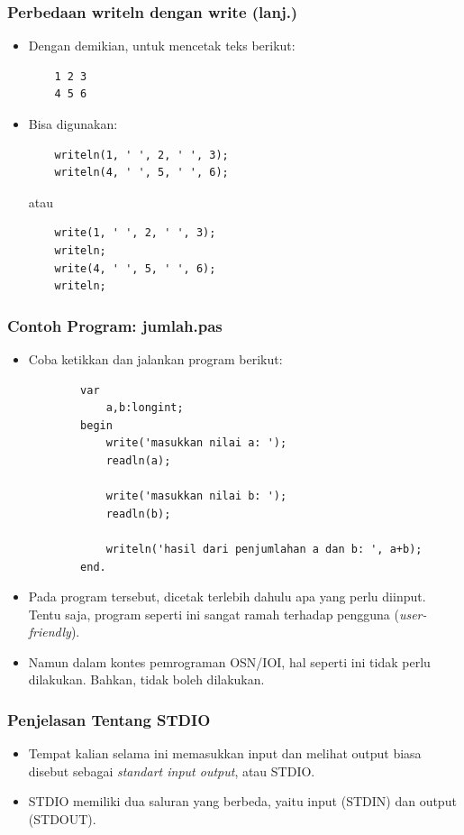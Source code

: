 \documentclass{beamer}
\begin{document}
\begin{frame}[fragile]
\frametitle{Perbedaan writeln dengan write (lanj.)}
\begin{itemize}
	\item Dengan demikian, untuk mencetak teks berikut:
	\begin{lstlisting}
	1 2 3
	4 5 6
	\end{lstlisting}
	\item Bisa digunakan:
	\begin{lstlisting}
	writeln(1, ' ', 2, ' ', 3);
	writeln(4, ' ', 5, ' ', 6);
	\end{lstlisting}
	atau
	\begin{lstlisting}
	write(1, ' ', 2, ' ', 3);
	writeln;
	write(4, ' ', 5, ' ', 6);
	writeln;
	\end{lstlisting}
\end{itemize}
\end{frame}

\begin{frame}[fragile]
\frametitle{Contoh Program: jumlah.pas}
\begin{itemize}
	\item Coba ketikkan dan jalankan program berikut:
	\begin{lstlisting}
		var
		    a,b:longint;
		begin
		    write('masukkan nilai a: ');
		    readln(a);
		    
		    write('masukkan nilai b: ');
		    readln(b);
		    
		    writeln('hasil dari penjumlahan a dan b: ', a+b);
		end.
	\end{lstlisting}
	\item Pada program tersebut, dicetak terlebih dahulu apa yang perlu diinput. Tentu saja, program seperti ini sangat ramah terhadap pengguna (\textit{user-friendly}).
	\item Namun dalam kontes pemrograman OSN/IOI, hal seperti ini tidak perlu dilakukan. Bahkan, tidak boleh dilakukan.
\end{itemize}
\end{frame}

\begin{frame}
\frametitle{Penjelasan Tentang STDIO}
\begin{itemize}
	\item Tempat kalian selama ini memasukkan input dan melihat output biasa disebut sebagai \textit{standart input output}, atau STDIO.
	\item STDIO memiliki dua saluran yang berbeda, yaitu input (STDIN) dan output (STDOUT).
\end{itemize}
\end{frame}
\end{document}
